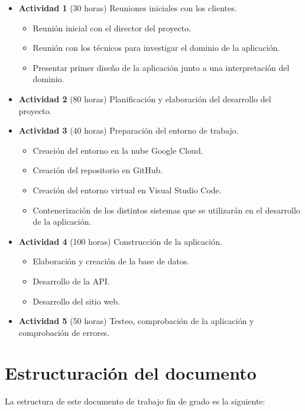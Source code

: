 \begin{itemize}
    \item \textbf{Actividad 1} (30 horas) Reuniones iniciales con los clientes.
          \begin{itemize}
              \item Reunión inicial con el director del proyecto.
              \item Reunión con los técnicos para investigar el dominio de la aplicación.
              \item Presentar primer diseño de la aplicación junto a una interpretación del dominio.
          \end{itemize}
    \item \textbf{Actividad 2} (80 horas) Planificación y elaboración del desarrollo del proyecto.
    \item \textbf{Actividad 3} (40 horas) Preparación del entorno de trabajo.
          \begin{itemize}
              \item Creación del entorno en la nube Google Cloud.
              \item Creación del repositorio en GitHub.
              \item Creación del entorno virtual en Visual Studio Code.
              \item Contenerización de los distintos sistemas que se utilizarán en el desarrollo de la aplicación.
          \end{itemize}
    \item \textbf{Actividad 4} (100 horas) Construcción de la aplicación.
          \begin{itemize}
              \item Elaboración y creación de la base de datos.
              \item Desarrollo de la API.
              \item Desarrollo del sitio web.
          \end{itemize}
    \item \textbf{Actividad 5} (50 horas) Testeo, comprobación de la aplicación y comprobación de errores.
\end{itemize}


\section{Estructuración del documento}

La estructura de este documento de trabajo fin de grado es la siguiente:

